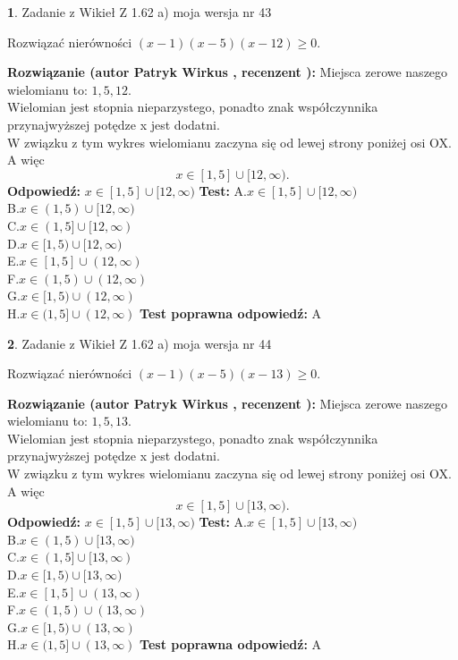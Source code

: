 \documentclass[12pt, a4paper]{article}
\theoremstyle{definition} %
\newtheorem{zad}{}
\newcommand{\zadStart}[1]{\begin{zad}#1\newline}
\newcommand{\zadStop}{\end{zad}}
\newcommand{\rozwStart}[2]{\noindent \textbf{Rozwiązanie (autor #1 , recenzent #2): }\newline}
\newcommand{\rozwStop}{\newline}
\newcommand{\odpStart}{\noindent \textbf{Odpowiedź:}\newline}
\newcommand{\odpStop}{\newline}
\newcommand{\testStart}{\noindent \textbf{Test:}\newline}
\newcommand{\testStop}{\newline}
\newcommand{\kluczStart}{\noindent \textbf{Test poprawna odpowiedź:}\newline}
\newcommand{\kluczStop}{\newline}
\begin{document}
\zadStart{Zadanie z Wikieł Z 1.62 a) moja wersja nr 43}

Rozwiązać nierówności $(x-1)(x-5)(x-12)\ge0$.
\zadStop
\rozwStart{Patryk Wirkus}{}
Miejsca zerowe naszego wielomianu to: $1, 5, 12$.\\
Wielomian jest stopnia nieparzystego, ponadto znak współczynnika przy\linebreak najwyższej potędze x jest dodatni.\\ W związku z tym wykres wielomianu zaczyna się od lewej strony poniżej osi OX. A więc $$x \in [1,5] \cup [12,\infty).$$
\rozwStop
\odpStart
$x \in [1,5] \cup [12,\infty)$
\odpStop
\testStart
A.$x \in [1,5] \cup [12,\infty)$\\
B.$x \in (1,5) \cup [12,\infty)$\\
C.$x \in (1,5] \cup [12,\infty)$\\
D.$x \in [1,5) \cup [12,\infty)$\\
E.$x \in [1,5] \cup (12,\infty)$\\
F.$x \in (1,5) \cup (12,\infty)$\\
G.$x \in [1,5) \cup (12,\infty)$\\
H.$x \in (1,5] \cup (12,\infty)$
\testStop
\kluczStart
A
\kluczStop



\zadStart{Zadanie z Wikieł Z 1.62 a) moja wersja nr 44}

Rozwiązać nierówności $(x-1)(x-5)(x-13)\ge0$.
\zadStop
\rozwStart{Patryk Wirkus}{}
Miejsca zerowe naszego wielomianu to: $1, 5, 13$.\\
Wielomian jest stopnia nieparzystego, ponadto znak współczynnika przy\linebreak najwyższej potędze x jest dodatni.\\ W związku z tym wykres wielomianu zaczyna się od lewej strony poniżej osi OX. A więc $$x \in [1,5] \cup [13,\infty).$$
\rozwStop
\odpStart
$x \in [1,5] \cup [13,\infty)$
\odpStop
\testStart
A.$x \in [1,5] \cup [13,\infty)$\\
B.$x \in (1,5) \cup [13,\infty)$\\
C.$x \in (1,5] \cup [13,\infty)$\\
D.$x \in [1,5) \cup [13,\infty)$\\
E.$x \in [1,5] \cup (13,\infty)$\\
F.$x \in (1,5) \cup (13,\infty)$\\
G.$x \in [1,5) \cup (13,\infty)$\\
H.$x \in (1,5] \cup (13,\infty)$
\testStop
\kluczStart
A
\kluczStop
\end{document}
